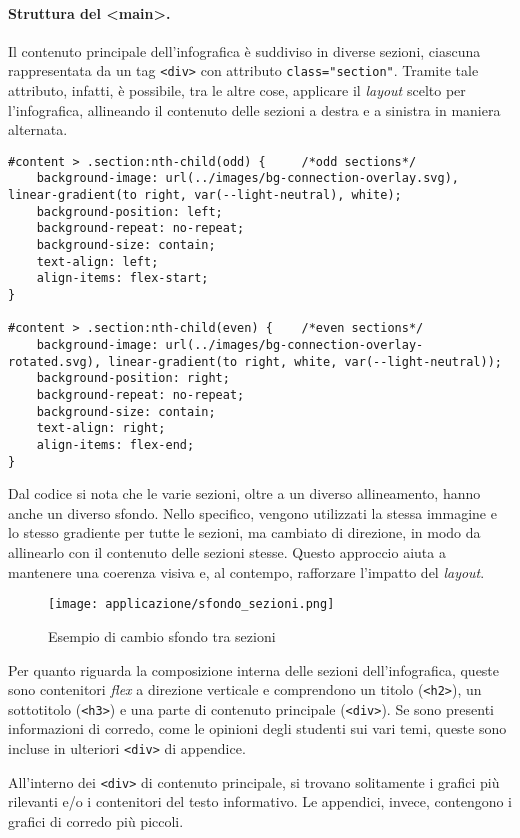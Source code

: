 \paragraph{Struttura del <main>.}\label{par:app_main} 
Il contenuto principale dell'infografica è suddiviso in diverse sezioni, ciascuna rappresentata da un tag \texttt{<div>} con attributo \texttt{class="section"}. Tramite tale attributo, infatti,
è possibile, tra le altre cose, applicare il \emph{layout} scelto per l'infografica, allineando il contenuto delle sezioni a destra e a sinistra in maniera alternata.
\begin{lstlisting}[style=htmlcssjs]
#content > .section:nth-child(odd) {     /*odd sections*/
    background-image: url(../images/bg-connection-overlay.svg), linear-gradient(to right, var(--light-neutral), white);
    background-position: left;
    background-repeat: no-repeat;
    background-size: contain;
    text-align: left;
    align-items: flex-start;
}

#content > .section:nth-child(even) {    /*even sections*/
    background-image: url(../images/bg-connection-overlay-rotated.svg), linear-gradient(to right, white, var(--light-neutral));
    background-position: right;
    background-repeat: no-repeat;
    background-size: contain;
    text-align: right;
    align-items: flex-end;
}
\end{lstlisting}
Dal codice si nota che le varie sezioni, oltre a un diverso allineamento, hanno anche un diverso sfondo. Nello specifico, vengono utilizzati la stessa immagine 
e lo stesso gradiente per tutte le sezioni, ma cambiato di direzione, in modo da allinearlo con il contenuto delle sezioni stesse. 
Questo approccio aiuta a mantenere una coerenza visiva e, al contempo, rafforzare l'impatto del \emph{layout}.
\begin{figure}[h]
    \centering
    \texttt{[image: applicazione/sfondo\_sezioni.png]}
    \caption{Esempio di cambio sfondo tra sezioni}
    \label{fig:app_sfondo_sezione}
\end{figure}

Per quanto riguarda la composizione interna delle sezioni dell'infografica, queste sono contenitori \emph{flex} a direzione verticale e comprendono un titolo (\texttt{<h2>}), un sottotitolo (\texttt{<h3>}) e una parte di 
contenuto principale (\texttt{<div>}). Se sono presenti informazioni di corredo, come le opinioni degli studenti sui vari temi, queste sono incluse in ulteriori \texttt{<div>} di appendice.

All'interno dei \texttt{<div>} di contenuto principale, si trovano solitamente i grafici più rilevanti e/o i contenitori del testo informativo. Le appendici, invece, contengono i grafici di corredo più piccoli. 

